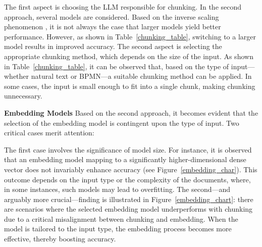 \documentclass[%
    paper=A4,                    %
    twoside=true,               %
    openright,                  %
    parskip=full,               %
    chapterprefix=true,         %
    11pt,                       %
    headings=normal,            %
    bibliography=totoc,         %
    listof=totoc,              %
    titlepage=on,              %
    captions=tableabove,        %
    draft=false,               %
]{scrreprt}%
\begin{document}
   The first aspect is choosing the LLM responsible for chunking. In the second approach, several models are considered. Based on the inverse scaling phenomenon \cite{mckenzie2023inverse}, it is not always the case that larger models yield better performance. However, as shown in Table~\ref{chunking_table}, switching to a larger model results in improved accuracy.
   The second aspect is selecting the appropriate chunking method, which depends on the size of the input. As shown in Table~\ref{chunking_table}, it can be observed that, based on the type of input—whether natural text or BPMN—a suitable chunking method can be applied. In some cases, the input is small enough to fit into a single chunk, making chunking unnecessary.
   



    
    
    

\textbf{Embedding Models}\hspace{0.5em}
Based on the second approach, it becomes evident that the selection of the embedding model is contingent upon the type of input. Two critical cases merit attention:

The first case involves the significance of model size. For instance, it is observed that an embedding model mapping to a significantly higher-dimensional dense vector does not invariably enhance accuracy (see Figure~\ref{embedding_char}). This outcome depends on the input type or the complexity of the documents, where, in some instances, such models may lead to overfitting.
The second—and arguably more crucial—finding is illustrated in Figure~\ref{embedding_chart}: there are scenarios where the selected embedding model underperforms with chunking due to a critical misalignment between chunking and embedding. When the model is tailored to the input type, the embedding process becomes more effective, thereby boosting accuracy.
\end{document}
